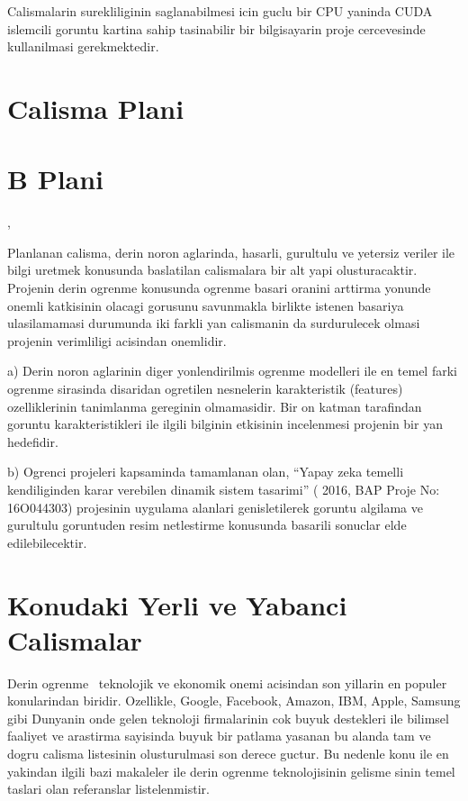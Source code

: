 Calismalarin surekliliginin saglanabilmesi icin guclu bir CPU yaninda
CUDA islemcili goruntu kartina sahip tasinabilir bir bilgisayarin
proje cercevesinde kullanilmasi gerekmektedir.


\section{ Calisma Plani} 



\section{B Plani}, 

Planlanan calisma, derin noron aglarinda, hasarli, gurultulu ve
yetersiz veriler ile bilgi uretmek konusunda baslatilan calismalara
bir alt yapi olusturacaktir. Projenin derin ogrenme konusunda ogrenme
basari oranini arttirma yonunde onemli katkisinin olacagi gorusunu
savunmakla birlikte istenen basariya ulasilamamasi durumunda iki
farkli yan calismanin da surdurulecek olmasi projenin verimliligi
acisindan onemlidir.

a) Derin noron aglarinin diger yonlendirilmis ogrenme modelleri ile en
temel farki ogrenme sirasinda disaridan ogretilen nesnelerin
karakteristik (features) ozelliklerinin tanimlanma gereginin
olmamasidir. Bir on katman tarafindan goruntu karakteristikleri ile
ilgili bilginin etkisinin incelenmesi projenin bir yan hedefidir.
 
b) Ogrenci projeleri kapsaminda tamamlanan olan, ``Yapay zeka temelli
kendiliginden karar verebilen dinamik sistem tasarimi'' 
( 2016, BAP Proje No: 16O044303) projesinin uygulama alanlari
genisletilerek goruntu algilama ve gurultulu goruntuden resim
netlestirme konusunda basarili sonuclar elde edilebilecektir.


\section{Konudaki Yerli ve Yabanci Calismalar}

Derin ogrenme~\cite{Hinton:2006,LeCun:2013} teknolojik ve ekonomik onemi
acisindan son yillarin en populer konularindan biridir. Ozellikle,
Google, Facebook, Amazon, IBM, Apple, Samsung gibi Dunyanin onde gelen
teknoloji firmalarinin cok buyuk destekleri ile bilimsel faaliyet ve
arastirma sayisinda buyuk bir patlama yasanan bu alanda tam ve dogru
calisma listesinin olusturulmasi son derece guctur. Bu nedenle konu
ile en yakindan ilgili bazi makaleler ile derin ogrenme teknolojisinin
gelisme sinin temel taslari olan referanslar listelenmistir.

